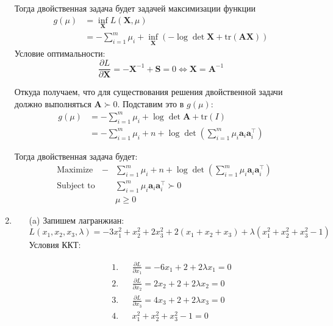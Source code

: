 \documentclass{article}
\begin{document}
\begin{enumerate}
	      Тогда двойственная задача будет задачей
	      максимизации функции
	      \begin{align*}
		      g(\mu) & = \inf_{\mathbf{X}}
		      L(\mathbf{X}, \mu)             \\
		             & = -\sum_{i=1}^m \mu_i
		      + \inf_{\mathbf{X}}
		      \left( -\log\det \mathbf{X}
		      + \mathrm{tr} (\mathbf{AX}) \right)
	      \end{align*}
	      Условие оптимальности:
	      \[
		      \frac{\partial L}{\partial \mathbf{X}} = -\mathbf{X}^{-1} + \mathbf{S} = 0 \iff \mathbf{X} =
		      \mathbf{A}^{-1}
	      \]

	      Откуда получаем, что для существования решения
	      двойственной задачи должно выполняться
	      $\mathbf{A} \succ 0$. Подставим это в
	      $g(\mu)$:
	      \begin{align*}
		      g(\mu) & = -\sum_{i=1}^m \mu_i +
		      \log\det \mathbf{A} + \mathrm{tr}(I) \\
		             & = -\sum_{i=1}^m \mu_i + n +
		      \log\det \left( \sum_{i=1}^{m}
		      \mu_i \mathbf{a}_i
		      \mathbf{a}_i^\top \right)
	      \end{align*}

	      Тогда двойственная задача будет:
	      \begin{equation*}
		      \begin{aligned}
			       & \text{Maximize}   & - & \sum_{i=1}^m \mu_i + n +
			      \log\det \left( \sum_{i=1}^{m}
			      \mu_i \mathbf{a}_i
			      \mathbf{a}_i^\top \right)                           \\
			       & \text{Subject to} &   & \sum_{i=1}^{m}
			      \mu_i \mathbf{a}_i
			      \mathbf{a}_i^\top \succ 0                           \\
			       &                   &   & \mu \geq 0
		      \end{aligned}
	      \end{equation*}

	\item
	      \begin{itemize}
		      \item[(a)]
			      Запишем лагранжиан:
			      \[
				      L(x_1, x_2, x_3, \lambda) = -3x_1^2 + x_2^2 + 2x_3^2 + 2(x_1 + x_2 + x_3) + \lambda (x_1^2 + x_2^2 + x_3^2 - 1)
			      \]
			      Условия ККТ:

			      \begin{equation*}
				      \begin{aligned}
					       & \text{1.} &  &
					      \frac{\partial L}{\partial x_1} =
					      -6x_1 + 2 + 2\lambda x_1 = 0 \\
					       & \text{2.} &  &
					      \frac{\partial L}{\partial x_2} =
					      2x_2 + 2 + 2\lambda x_2 = 0  \\
					       & \text{3.} &  &
					      \frac{\partial L}{\partial x_3} =
					      4x_3 + 2 + 2\lambda x_3 = 0  \\
					       & \text{4.} &  &
					      x_1^2 + x_2^2 + x_3^2 - 1 = 0
				      \end{aligned}
			      \end{equation*}


\end{itemize}
\end{enumerate}
\end{document}
